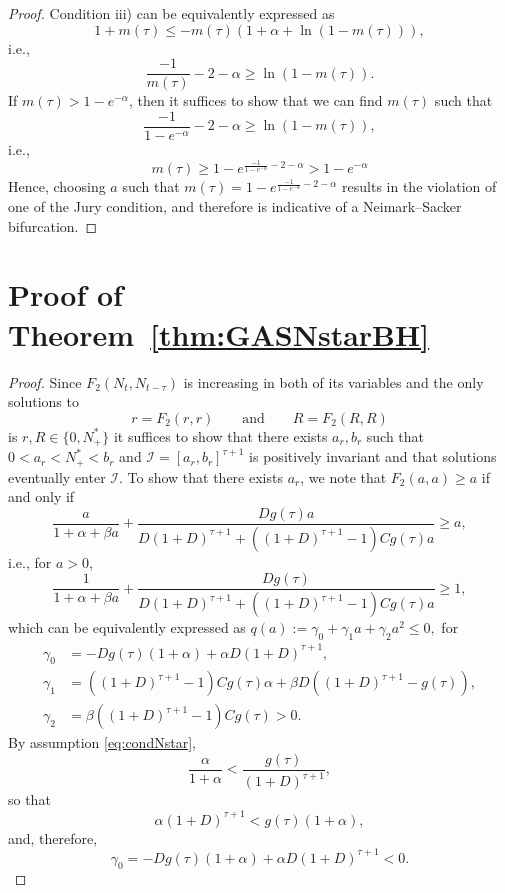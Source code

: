 \documentclass{article}
\newtheorem{theorem}{Theorem}
\numberwithin{theorem}{section}
\begin{document}
{\begin{proof}
Condition iii) can be equivalently expressed as
$$1+m(\tau)\leq -m(\tau)(1+\alpha+\ln(1-m(\tau))),$$
i.e., 
$$\frac{-1}{m(\tau)}-2-\alpha\geq \ln(1-m(\tau)).$$
If $m(\tau)>1-e^{-\alpha}$, then it suffices to show that we can find $m(\tau)$ such that 
$$\frac{-1}{1-e^{-\alpha}}-2-\alpha\geq \ln(1-m(\tau)),$$
i.e., 
$$m(\tau)\geq 1-e^{\frac{-1}{1-e^{-\alpha}}-2-\alpha}>1-e^{-\alpha}$$
Hence, choosing $a$ such that $m(\tau)= 1-e^{\frac{-1}{1-e^{-\alpha}}-2-\alpha}$ results in the violation of one of the Jury condition, and therefore is indicative of a  Neimark--Sacker bifurcation. 
\end{proof}



\section{Proof of Theorem~\ref{thm:GASNstarBH}}\label{A:thmGASNstarBH}



\begin{proof}
    Since $F_2(N_t,N_{t-\tau})$ is increasing in both of its variables and the only solutions to 
    $$r=F_2(r,r)\qquad \mbox{and}\qquad R=F_2(R,R)$$
    is $r,R\in \{0,N^*_+\}$ it suffices to show that there exists $a_r, b_r$ such that  $0<a_r<N^*_+< b_r$ and $\mathcal{I}=[a_r, b_r]^{\tau+1}$ is positively invariant and that solutions eventually enter $\mathcal{I}$. 
To show that there exists $a_r$, we note that 
$F_2(a,a)\geq a$ if and only if 
$$\frac{a}{1+\alpha+\beta a}+\frac{Dg(\tau)a}{D(1+D)^{\tau+1}+((1+D)^{\tau+1}-1)Cg(\tau)a}\geq a, $$
i.e., for $a>0$, 
$$\frac{1}{1+\alpha+\beta a}+\frac{Dg(\tau)}{D(1+D)^{\tau+1}+((1+D)^{\tau+1}-1)Cg(\tau)a}\geq 1, $$
which can be equivalently expressed as 
$q(a):=\gamma_0+\gamma_1a + \gamma_2a^2\leq 0,$
for 
\begin{align*}
    \gamma_0&=-Dg(\tau)(1+\alpha)+\alpha D(1+D)^{\tau+1},\\
    \gamma_1&=((1+D)^{\tau+1}-1)Cg(\tau) \alpha+
\beta  D\left((1+D)^{\tau+1}
- g(\tau)\right),\\
\gamma_2&=\beta ((1+D)^{\tau+1}-1)Cg(\tau)>0.
\end{align*}
By assumption \eqref{eq:condNstar}, 
$$\frac{\alpha}{1+\alpha} <\frac{g(\tau)}{(1+D)^{\tau+1}},$$
so that $$\alpha (1+D)^{\tau+1}<g(\tau)(1+\alpha),$$
and, therefore, 
$$\gamma_0=-Dg(\tau)(1+\alpha)+\alpha D(1+D)^{\tau+1}<0.$$


\end{proof}}
\end{document}

